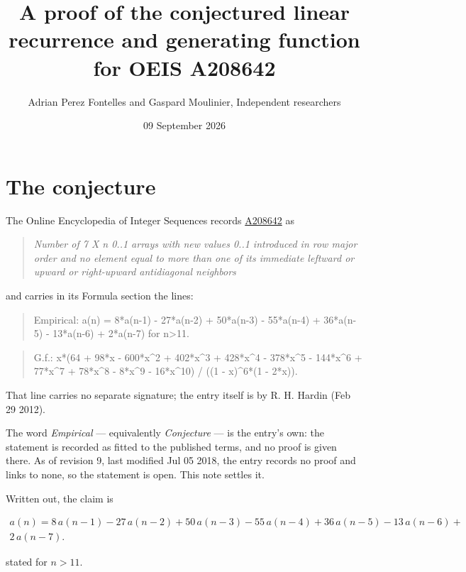 \documentclass[11pt]{article}
\title{A proof of the conjectured linear recurrence and generating function for OEIS A208642}
\author{Adrian Perez Fontelles and Gaspard Moulinier, Independent researchers}
\date{09 September 2026}
\theoremstyle{definition}
\begin{document}
\maketitle
\section{The conjecture}

The Online Encyclopedia of Integer Sequences records \href{https://oeis.org/A208642}{A208642} as

\begin{quote}\itshape Number of 7 X n 0..1 arrays with new values 0..1 introduced in row major order and no element equal to more than one of its immediate leftward or upward or right-upward antidiagonal neighbors\end{quote}

and carries in its Formula section the lines:

\begin{quote}\ttfamily Empirical: a(n) = 8*a(n-1) - 27*a(n-2) + 50*a(n-3) - 55*a(n-4) + 36*a(n-5) - 13*a(n-6) + 2*a(n-7) for n>11.\end{quote}

\begin{quote}\ttfamily G.f.: x*(64 + 98*x - 600*x\textasciicircum{}2 + 402*x\textasciicircum{}3 + 428*x\textasciicircum{}4 - 378*x\textasciicircum{}5 - 144*x\textasciicircum{}6 + 77*x\textasciicircum{}7 + 78*x\textasciicircum{}8 - 8*x\textasciicircum{}9 - 16*x\textasciicircum{}10) / ((1 - x)\textasciicircum{}6*(1 - 2*x)).\end{quote}

That line carries no separate signature; the entry itself is by R. H. Hardin (Feb 29 2012).

The word {\itshape Empirical} --- equivalently {\itshape Conjecture} --- is the entry's own: the statement is recorded as fitted to the published terms, and no proof is given there. As of revision 9, last modified Jul 05 2018, the entry records no proof and links to none, so the statement is open. This note settles it.

Written out, the claim is

\begin{multline*} a(n) = 8\,a(n-1) - 27\,a(n-2) + 50\,a(n-3) - 55\,a(n-4) + 36\,a(n-5) - 13\,a(n-6) + \\ 2\,a(n-7). \end{multline*}

stated for $n > 11$.
\end{document}

